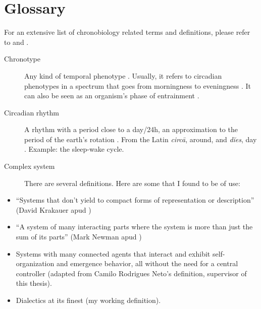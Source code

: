 \documentclass[
12pt,
openright,
oneside,
a4paper,
chapter=TITLE,
section=TITLE,
french,
spanish,
brazil,
english
]{abntex2}\usepackage{array}
\newenvironment{glossario}{
  \tocprintchapternonum
}{
  \cleardoublepage
}
\renewcommand{\tocprintchapternonum}{
  \addtocontents{toc}{\setlength{\cftchapterindent}{5.65em}}
  \addtocontents{toc}{\setlength{\cftchapternumwidth}{0em}}
}
\theoremstyle{plain}
\theoremstyle{remark}
\begin{document}
\begin{glossario}


\chapter*{Glossary}\label{glossary}


For an extensive list of chronobiology related terms and definitions,
please refer to \textcite{aschoff1965} and \textcite{marques2012}.

\begin{description}
\item[Chronotype]
\hspace{20cm}

Any kind of temporal phenotype \autocite{ehret1974,pittendrigh1993}.
Usually, it refers to circadian phenotypes in a spectrum that goes from
morningness to eveningness \autocite{roenneberg2003}. It can also be
seen as an organism's phase of entrainment \autocite{roenneberg2012a}.
\item[Circadian rhythm]
\hspace{20cm}

A rhythm with a period close to a day/24h, an approximation to the
period of the earth's rotation \autocite{pittendrigh1960}. From the
Latin \emph{circā}, around, and \emph{dĭes}, day \autocite{latinitium}.
Example: the sleep-wake cycle.
\item[Complex system]
\hspace{20cm}

There are several definitions. Here are some that I found to be of use:
\end{description}

\begin{itemize}
\tightlist
\item
  ``Systems that don't yield to compact forms of representation or
  description'' (David Krakauer apud \textcite{mitchell2013})
\item
  ``A system of many interacting parts where the system is more than
  just the sum of its parts'' (Mark Newman apud \textcite{mitchell2013})
\item
  Systems with many connected agents that interact and exhibit
  self-organization and emergence behavior, all without the need for a
  central controller (adapted from Camilo Rodrigues Neto's definition,
  supervisor of this thesis).
\item
  Dialectics at its finest (my working definition).
\end{itemize}


\end{glossario}
\end{document}
